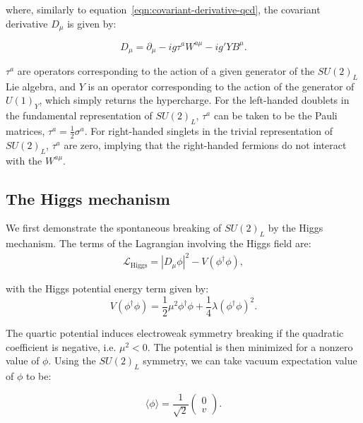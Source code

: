 where, similarly to equation~\ref{eqn:covariant-derivative-qcd}, the covariant derivative $D_{\mu}$ is given by:

\begin{equation}\label{eqn:covariant-derivative-ew}
	D_{\mu} = \partial_{\mu} - i g \tau^a W^{a\mu} - i g' Y B^{\mu}.
\end{equation}

$\tau^a$ are operators corresponding to the action of a given generator of the $SU(2)_L$ Lie algebra, and $Y$ is an operator corresponding to the action of the generator of $U(1)_Y$, which simply returns the hypercharge. For the left-handed doublets in the fundamental representation of $SU(2)_L$, $\tau^a$ can be taken to be the Pauli matrices, $\tau^a=\frac12 \sigma^a$. For right-handed singlets in the trivial representation of $SU(2)_L$, $\tau^a$ are zero, implying that the right-handed fermions do not interact with the $W^{a\mu}$. 



\subsection{The Higgs mechanism}
We first demonstrate the spontaneous breaking of $SU(2)_L$ by the Higgs mechanism. The terms of the Lagrangian involving the Higgs field are:
\begin{equation}\label{eqn:higg-lagrangian}
	\begin{multlined}
		\mathcal{L}_{\mathrm{Higgs}} = |D_{\mu}\phi|^2 - V(\phi^{\dagger}\phi),
	\end{multlined}
\end{equation}

with the Higgs potential energy term given by:
\begin{equation}\label{eqn:higgs-potential}
	V(\phi^{\dagger}\phi) = \frac12 \mu^2 \phi^{\dagger}\phi + \frac14 \lambda (\phi^{\dagger}\phi)^2.
\end{equation}


The quartic potential induces electroweak symmetry breaking if the quadratic coefficient is negative, i.e. $\mu^2<0$. The potential is then minimized for a nonzero value of $\phi$. Using the $SU(2)_L$ symmetry, we can take vacuum expectation value of $\phi$ to be:

\begin{equation}
	\langle \phi \rangle = \frac{1}{\sqrt{2}} \left(\begin{array}{c} 0 \\ v \end{array}\right).
\end{equation}
 
